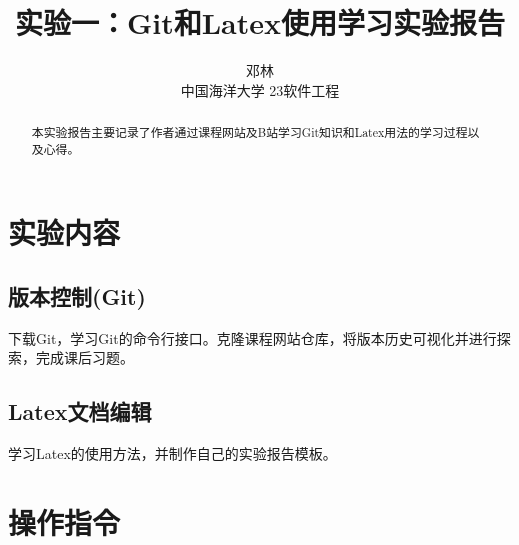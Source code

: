 \documentclass{ctexart}
\title{\heiti \zihao{2}实验一：Git和Latex使用学习实验报告}
\author{\kaishu \zihao{-4} 邓林\qquad 23020007014\\
\songti \zihao{-5}中国海洋大学 \qquad 23软件工程 }
\date{}
\begin{document}
    \maketitle
\vspace{-20pt}\begin{abstract}				
    本实验报告主要记录了作者通过课程网站及B站学习Git知识和Latex用法的学习过程以及心得。
\end{abstract}

\section{实验内容}
\subsection{版本控制(Git)}
下载Git，学习Git的命令行接口。克隆课程网站仓库，将版本历史可视化并进行探索，完成课后习题。\\
\subsection{Latex文档编辑}
学习Latex的使用方法，并制作自己的实验报告模板。\\
\vspace{-10pt}\section{操作指令}
\end{document}
